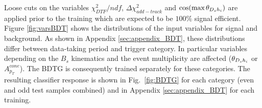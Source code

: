 Loose cuts on the variables  $\chi^2_{DTF}/ndf$,  $\Delta\chi^2_{add-track}$ and $\cos(\text{max} \, \theta_{{{D}_{s}} h_{i}})$ are applied prior to the training which are expected to be $100 \%$ signal efficient.
Figure \ref{fig:varsBDT} shows the distributions of the input variables for signal and background.
As shown in Appendix \ref{sec:appendix_BDT}, these distributions differ between data-taking period and trigger category.
In particular variables depending on the $B_s$ kinematics and the event multiplicity are affected (\eg $\theta_{{{D}_{s}} h_{i}}$ or $A^{cone}_{p_T}$).
The BDTG is consequently trained separately for these categories.
The resulting classifier response is shown in Fig.~\ref{fig:BDTG} for each category (even and odd test samples combined) and in Appendix \ref{sec:appendix_BDT} for each training.



